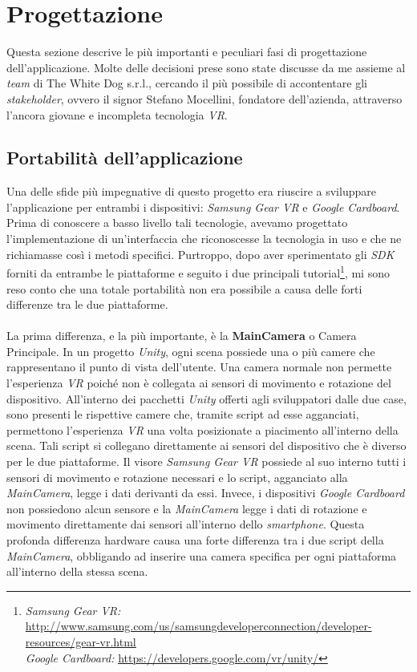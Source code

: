 \section{Progettazione}

Questa sezione descrive le più importanti e peculiari fasi di progettazione dell'applicazione. Molte delle decisioni prese sono state discusse da me assieme al \textit{team} di The White Dog s.r.l., cercando il più possibile di accontentare gli \textit{stakeholder}\hyperlink{sh}{}, ovvero il signor Stefano Mocellini, fondatore dell'azienda, attraverso l'ancora giovane e incompleta tecnologia \textit{VR}.

\hypertarget{3.2.1}{\subsection{Portabilità dell'applicazione}}

Una delle sfide più impegnative di questo progetto era riuscire a sviluppare l'applicazione per entrambi i dispositivi: \textit{Samsung Gear VR} e \textit{Google Cardboard}. Prima di conoscere a basso livello tali tecnologie, avevamo progettato l'implementazione di un'interfaccia che riconoscesse la tecnologia in uso e che ne richiamasse così i metodi specifici. Purtroppo, dopo aver sperimentato gli \textit{SDK} forniti da entrambe le piattaforme e seguito i due principali tutorial\footnote[1]{\textit{Samsung Gear VR:} \url{http://www.samsung.com/us/samsungdeveloperconnection/developer-resources/gear-vr.html} \\ \textit{Google Cardboard:} \url{https://developers.google.com/vr/unity/}}, mi sono reso conto che una totale portabilità non era possibile a causa delle forti differenze tra le due piattaforme. \\ \\
La prima differenza, e la più importante, è la \textbf{MainCamera} o Camera Principale. In un progetto \textit{Unity}, ogni scena possiede una o più camere che rappresentano il punto di vista dell'utente. Una camera normale non permette l'esperienza \textit{VR} poiché non è collegata ai sensori di movimento e rotazione del dispositivo. All'interno dei pacchetti \textit{Unity} offerti agli sviluppatori dalle due case, sono presenti le rispettive camere che, tramite script ad esse agganciati, permettono l'esperienza \textit{VR} una volta posizionate a piacimento all'interno della scena. Tali script si collegano direttamente ai sensori del dispositivo che è diverso per le due piattaforme. Il visore \textit{Samsung Gear VR} possiede al suo interno tutti i sensori di movimento e rotazione necessari e lo script, agganciato alla \textit{MainCamera}, legge i dati derivanti da essi. Invece, i dispositivi \textit{Google Cardboard} non possiedono alcun sensore e la \textit{MainCamera} legge i dati di rotazione e movimento direttamente dai sensori all'interno dello \textit{smartphone}. Questa profonda differenza hardware causa una forte differenza tra i due script della \textit{MainCamera}, obbligando ad inserire una camera specifica per ogni piattaforma all'interno della stessa scena.

